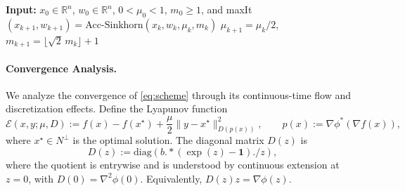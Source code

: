 \documentclass{article}
\newcommand{\dd}{\,{\rm d}}
\theoremstyle{plain}
\newtheorem{lemma}{Lemma}
\theoremstyle{remark}
\newtheorem*{remark}{Remark}
\begin{document}
\begin{algorithm}[htbp]
\caption{Acc-Sinkhorn with Homotopy}
\label{alg:A2MD-homotopy}
\begin{algorithmic}[1]
\STATE \textbf{Input:} $x_0\in\mathbb{R}^n$, $w_0\in\mathbb{R}^n$, $0<\mu_0<1$, $m_0\geq 1$, and maxIt
    \STATE $(x_{k+1},w_{k+1})=\text{Acc-Sinkhorn}(x_k,w_k,\mu_k,m_k)$
    \STATE $\mu_{k+1}=\mu_k/2$, \quad $m_{k+1}=\lfloor\sqrt{2}\,m_k\rfloor+1$
\ENDFOR
\end{algorithmic}
\end{algorithm}



\paragraph{Convergence Analysis.}
We analyze the convergence of \eqref{eq:scheme} through its continuous-time flow and discretization effects. Define the Lyapunov function
\begin{equation}
\mathcal{E}(x,y;\mu,D):=f(x)-f(x^\star)+\frac{\mu}{2}\|y-x^\star\|_{D(p(x))}^2,
\qquad
p(x):=\nabla\phi^*(\nabla f(x)),
\end{equation}
where $x^\star\in N^\perp$ is the optimal solution. The diagonal matrix $D(z)$ is
\begin{equation}\label{eq:D}
D(z):=\mathrm{diag}\!\left(b.*(\exp(z)-\mathbf{1})./z\right),
\end{equation}
where the quotient is entrywise and is understood by continuous extension at $z=0$, with $D(0)=\nabla^2\phi(0)$. Equivalently, $D(z)z=\nabla\phi(z)$.
\end{document}

